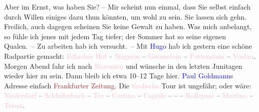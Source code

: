                Aber im Ernst, was haben Sie? – Mir scheint nun einmal, dass Sie selbst einfach durch
               Willen einiges dazu thun könnten, um wohl zu sein. Sie lassen sich gehn. Freilich,
               auch dagegen scheinen Sie keine Gewalt zu haben.\pend
           \pstart
           Was mich anbelangt, so fühle ich jenes \label{K_L00928_1v}\label{K_L00928_1h} mit {\pb}jedem Tag tiefer; der Sommer hat so seine
               eigenen Qualen. – Zu arbeiten hab ich versucht. – Mit \textcolor{blue}{Hugo}{}\ledrightnote{\textcolor{blue}{Hugo von Hofmannsthal}} hab ich gestern eine schöne Radpartie gemacht: \textcolor{pink}{Edlacher Hof}{}\ledrightnote{\textcolor{pink}{Hotel Edlacherhof}} – \textcolor{pink}{Singerin}{}\ledrightnote{\textcolor{pink}{Gasthof zur Singerin}} – \textcolor{pink}{Gutenstein}{}\ledrightnote{\textcolor{pink}{Gutenstein}} – \textcolor{pink}{Pottenstein}{}\ledrightnote{\textcolor{pink}{Pottenstein}} – \textcolor{pink}{Vöslau}{}\ledrightnote{\textcolor{pink}{Bad Vöslau}}.\pend
           \pstart
           Morgen Abend fahr ich nach \textcolor{pink}{Slavonien}{}\ledrightnote{\textcolor{pink}{Slavonija}} und wünsche
               in den letzten Junitagen wieder hier zu sein. Dann bleib ich etwa 10–12
               Tage hier.\pend
           \pstart
           \textcolor{blue}{Paul Goldmann}{}\ledrightnote{\textcolor{blue}{Paul Goldmann}}s Adresse einfach \textcolor{brown}{Frankfurter Zeitung}{}\ledrightnote{\textcolor{brown}{Frankfurter Zeitung}}.\pend
           \pstart
           Die \textcolor{pink}{tirolische}{}\ledrightnote{\textcolor{pink}{Tirol}{\newline}\textcolor{pink}{Südtirol}} Tour ist ungefähr; oder wäre:
                  \textcolor{pink}{Niederdorf}{}\ledrightnote{\textcolor{pink}{Niederdorf}} – \textcolor{pink}{Schluderbach}{}\ledrightnote{\textcolor{pink}{Carbonin}} – \textcolor{pink}{Tre \label{T_L00928_1v}\label{T_L00928_1h}}{}\ledrightnote{\textcolor{pink}{Tre Croci}} – \textcolor{pink}{Cortina}{}\ledrightnote{\textcolor{pink}{Cortina d'Ampezzo}} – \textcolor{pink}{Caprile}{}\ledrightnote{\textcolor{pink}{Alleghe}} – \label{T_L00928_2v}\label{T_L00928_2h} – \label{T_L00928_3v}\label{T_L00928_3h} – \textcolor{pink}{Rollepass}{}\ledrightnote{\textcolor{pink}{Passo Rolle}} – \textcolor{pink}{Martino}{}\ledrightnote{\textcolor{pink}{San Martino di Castrozza}} – \textcolor{pink}{Trient}{}\ledrightnote{\textcolor{pink}{Trient}}.\pend
